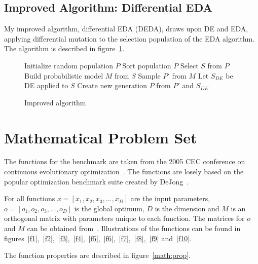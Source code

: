 \subsection{Improved Algorithm: Differential EDA}

My improved algorithm, differential EDA (DEDA), draws upon DE and EDA, applying differential mutation to the selection population of the EDA algorithm. The algorithm is described in figure~\ref{algo:my}.


\begin{figure}[h]
  \centering
  \begin{minipage}{12.5cm}
    \begin{algorithmic}
      \State Initialize random population $P$
      \Repeat
        \State Sort population $P$
        \State Select $S$ from $P$
        \State Build probabilistic model $M$ from $S$
        \State Sample $P'$ from $M$
        \State Let $S_{DE}$ be DE applied to $S$
        \State Create new generation $P$ from $P'$ and $S_{DE}$
    \end{algorithmic}
  \end{minipage}
  \caption{Improved algorithm}
  \label{algo:my}
\end{figure}



\section{Mathematical Problem Set}

The functions for the benchmark are taken from the 2005 CEC conference on continuous evolutionary optimization~\cite{suganthan2005problem}. The functions are losely based on the popular optimization benchmark suite created by DeJong~\cite{Whitley1996245}.

For all functions $x=[x_1,x_2,x_3,...,x_D]$ are the input parameters, $o=[o_1,o_2,o_3,...,o_D]$ is the global optimum, $D$ is the dimension and $M$ is an orthogonal matrix with parameters unique to each function. The matrices for $o$ and $M$ can be obtained from~\cite{suganthan2005problem}. Illustrations of the functions can be found in figures~\ref{f1},~\ref{f2},~\ref{f3},~\ref{f4},~\ref{f5},~\ref{f6},~\ref{f7},~\ref{f8},~\ref{f9} and~\ref{f10}.

The function properties are described in figure~\ref{math:prop}.

